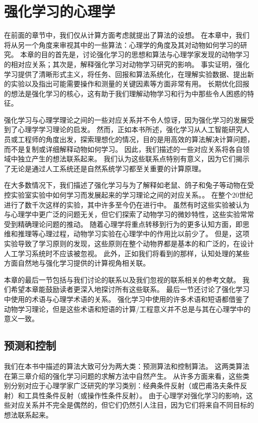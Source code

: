 

\chapter{强化学习的心理学} \label{chap:chap11}

在前面的章节中，我们仅从计算方面考虑就提出了算法的设想。
在本章中，我们将从另一个角度来审视其中的一些算法：心理学的角度及其对动物如何学习的研究。
本章的目的首先是，讨论强化学习的思想和算法与心理学家发现的动物学习的相对应关系；其次是，解释强化学习对动物学习研究的影响。
事实证明，强化学习提供了清晰形式主义，将任务、回报和算法系统化，在理解实验数据、提出新的实验以及指出可能需要操作和测量的关键因素等方面非常有用。
长期优化回报的想法是强化学习的核心，这有助于我们理解动物学习和行为中那些令人困惑的特征。


强化学习与心理学理论之间的一些对应关系并不令人惊讶，因为强化学习的发展受到了心理学学习理论的启发。
然而，正如本书所述，强化学习从人工智能研究人员或工程师的角度出发，探索理想化的情况，目的是用高效的算法解决计算问题，而不是复制或详细解释动物如何学习。
因此，我们描述的一些对应关系将各自领域中独立产生的想法联系起来。
我们认为这些联系点特别有意义，因为它们揭示了无论是通过人工系统还是自然系统学习都至关重要的计算原理。


在大多数情况下，我们描述了强化学习与为了解释如老鼠、鸽子和兔子等动物在受控实验室实验中如何学习而发展起来的学习理论之间的对应关系。。
在整个20世纪进行了数千次这样的实验，其中许多至今仍在进行中。
虽然有时这些实验被认为与心理学中更广泛的问题无关，但它们探索了动物学习的微妙特性，这些实验常常受到精确理论问题的推动。
随着心理学将重点转移到行为的更多认知方面，即思维和推理等心理过程，动物学习实验在心理学中的作用比以前少了。
但是，这项实验导致了学习原则的发现，这些原则在整个动物界都是基本的和广泛的，在设计人工学习系统时不应该被忽视。
此外，正如我们将看到的那样，认知处理的某些方面自然地与强化学习提供的计算视角相关联。


本章的最后一节包括与我们讨论的联系以及我们忽视的联系相关的参考文献。
我们希望本章能鼓励读者更深入地探讨所有这些联系。
最后一节还讨论了强化学习中使用的术语与心理学术语的关系。
强化学习中使用的许多术语和短语都借鉴了动物学习理论，但是这些术语和短语的计算/工程意义并不总是与其在心理学中的意义一致。


\section{预测和控制}


我们在本书中描述的算法大致可分为两大类：预测算法和控制算法。
这两类算法在第三章介绍的强化学习问题的求解方法中自然产生。
从许多方面来看，这些类别分别对应于心理学家广泛研究的学习类别：经典条件反射（或巴甫洛夫条件反射）和工具性条件反射（或操作性条件反射）。
由于心理学对强化学习的影响，这些对应关系并不完全是偶然的，但它们仍然引人注目，因为它们将来自不同目标的想法联系起来。


